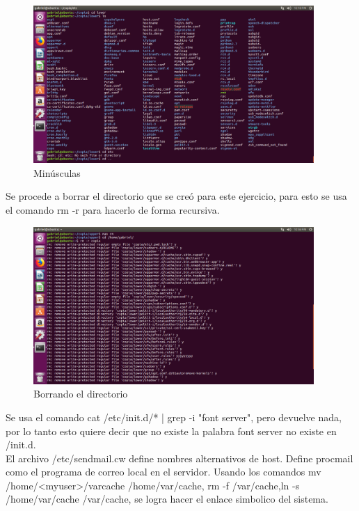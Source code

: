 \documentclass[
  letterpaper, 
  maincolor=black,
  sectioncolor=black!90,
  subsectioncolor=black!70,
  itemtextcolor=black!40,
]{fortysecondscv}
\begin{document}
        \begin{figure}[H]
            \centering
            \includegraphics[trim= 0 550 350 0,clip,width=0.95\textwidth]{img/lower.jpg}
            \caption{Minúsculas}
            \label{fig:my_label}
        \end{figure}
    Se procede a borrar el directorio que se creó para este ejercicio, para esto se usa el comando rm -r para hacerlo de forma recursiva.
        \begin{figure}[H]
            \centering
            \includegraphics[trim= 0 520 300 0,clip,width=0.95\textwidth]{img/borrando.jpg}
            \caption{Borrando el directorio}
            \label{fig:my_label}
        \end{figure}
        Se usa el comando cat /etc/init.d/* | grep -i "font server", pero devuelve nada, por lo tanto esto quiere decir que no existe la palabra font server no existe en /init.d.\\
        El archivo /etc/sendmail.cw define nombres alternativos de host. Define procmail como el programa de correo local en el servidor.
        Usando los comandos mv /home/<myuser>/varcache /home/var/cache, rm -f /var/cache,ln -s /home/var/cache /var/cache, se logra hacer el enlace simbolico del sistema.
        
\end{document}
